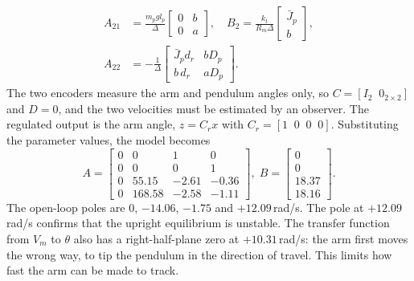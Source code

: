 \begin{align}
A_{21}&=\frac{m_pgl_p}{\Delta}\begin{bmatrix}0&b\\0&a\end{bmatrix},\quad B_2=\frac{k_t}{R_m\Delta}\begin{bmatrix}\bar J_p\\b\end{bmatrix},\nonumber\\
A_{22}&=-\frac{1}{\Delta}\begin{bmatrix}\bar J_pd_r&bD_p\\b\,d_r&aD_p\end{bmatrix}.
\end{align}
The two encoders measure the arm and pendulum angles only, so $C=[I_2\;\;0_{2\times2}]$ and $D=0$, and the two velocities must be estimated by an observer. The regulated output is the arm angle, $z=C_rx$ with $C_r=[1\;\;0\;\;0\;\;0]$. Substituting the parameter values, the model becomes
\begin{equation}
A=\begin{bmatrix}0&0&1&0\\0&0&0&1\\0&55.15&-2.61&-0.36\\0&168.58&-2.58&-1.11\end{bmatrix},\;
B=\begin{bmatrix}0\\0\\18.37\\18.16\end{bmatrix}.
\end{equation}
The open-loop poles are $0$, $-14.06$, $-1.75$ and $+12.09$\,rad/s. The pole at $+12.09$\,rad/s confirms that the upright equilibrium is unstable. The transfer function from $V_m$ to $\theta$ also has a right-half-plane zero at $+10.31$\,rad/s: the arm first moves the wrong way, to tip the pendulum in the direction of travel. This limits how fast the arm can be made to track.


